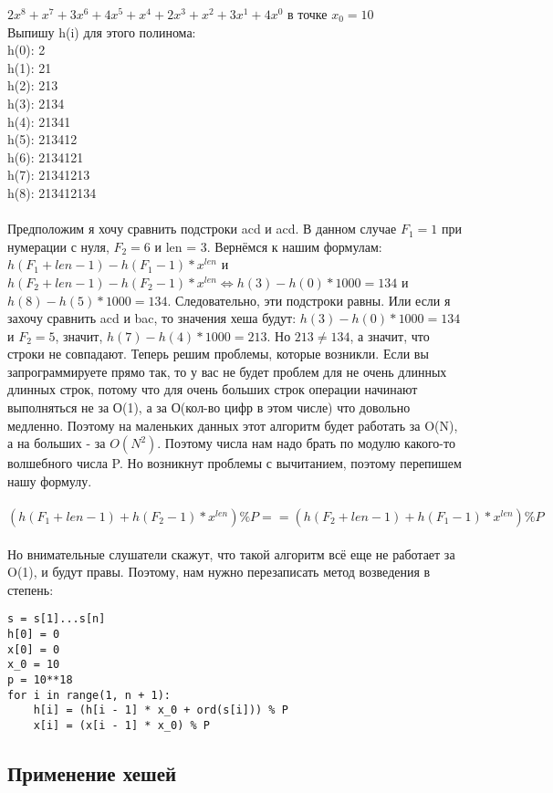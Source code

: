 \documentclass[a4paper,12pt]{article}
\begin{document}
$2x^8 + x^7 + 3x^6 + 4x^5 + x^4 + 2x^3 + x^2 + 3x^1 + 4x^0$ в точке $x_0 = 10$\\
Выпишу h(i) для этого полинома:\\
h(0): 2\\
h(1): 21\\
h(2): 213\\
h(3): 2134\\
h(4): 21341\\
h(5): 213412\\
h(6): 2134121\\
h(7): 21341213\\
h(8): 213412134\\ \\
Предположим я хочу сравнить подстроки acd и acd. В данном случае $F_1 = 1$ при нумерации с нуля, $F_2 = 6$ и len = 3. Вернёмся к нашим формулам: $h(F_{1} + len - 1) - h(F_{1} - 1) * x^{len}$ и $h(F_{2} + len - 1) - h(F_{2} - 1) * x^{len} \Longleftrightarrow h(3) - h(0) * 1000 = 134$ и $h(8) - h(5) * 1000 = 134$. Следовательно, эти подстроки равны. Или если я захочу сравнить acd и bac, то значения хеша будут: $h(3) - h(0) * 1000 = 134$ и $F_2 = 5$, значит, $h(7) - h(4) * 1000 = 213$. Но $213 \neq 134$, а значит, что строки не совпадают. Теперь решим проблемы, которые возникли. Если вы запрограммируете прямо так, то у вас не будет проблем для не очень длинных длинных строк, потому что для очень больших строк операции начинают выполняться не за О(1), а за О(кол-во цифр в этом числе) что довольно медленно. Поэтому на маленьких данных этот алгоритм будет работать за O(N), а на больших - за $O(N^2)$. Поэтому числа нам надо брать по модулю какого-то волшебного числа P. Но возникнут проблемы с вычитанием, поэтому перепишем нашу формулу. \\ \\
$(h(F_{1} + len - 1) + h(F_{2} - 1) * x^{len}) \% P == (h(F_{2} + len - 1) + h(F_{1} - 1) * x^{len}) \% P$\\ \\
Но внимательные слушатели скажут, что такой алгоритм всё еще не работает за O(1), и будут правы. Поэтому, нам нужно перезаписать метод возведения в степень:
\begin{verbatim}
s = s[1]...s[n]
h[0] = 0
x[0] = 0
x_0 = 10
p = 10**18
for i in range(1, n + 1):
    h[i] = (h[i - 1] * x_0 + ord(s[i])) % P
    x[i] = (x[i - 1] * x_0) % P
\end{verbatim}
\subsection{Применение хешей}
\end{document}
